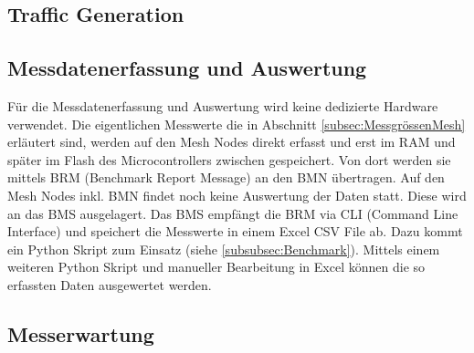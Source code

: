 
\subsection{Traffic Generation}\label{subsec:TrafficGeneration}




\subsection{Messdatenerfassung und Auswertung}\label{subsec:MessdatenerfassungundAuswertung}

Für die Messdatenerfassung und Auswertung wird keine dedizierte Hardware verwendet. Die eigentlichen Messwerte die in Abschnitt \ref{subsec:MessgrössenMesh} erläutert sind, werden auf den Mesh Nodes direkt erfasst und erst im RAM und später im Flash des Microcontrollers zwischen gespeichert. Von dort werden sie mittels BRM (Benchmark Report Message) an den BMN übertragen.
Auf den Mesh Nodes inkl. BMN findet noch keine Auswertung der Daten statt.
Diese wird an das BMS ausgelagert.
Das BMS empfängt die BRM via CLI (Command Line Interface) und speichert die Messwerte in einem Excel CSV File ab. Dazu kommt ein Python Skript zum Einsatz (siehe \ref{subsubsec:Benchmark}).
Mittels einem weiteren Python Skript und manueller Bearbeitung in Excel können die so erfassten Daten ausgewertet werden.

\subsection{Messerwartung}\label{subsec:Messerwartung}

